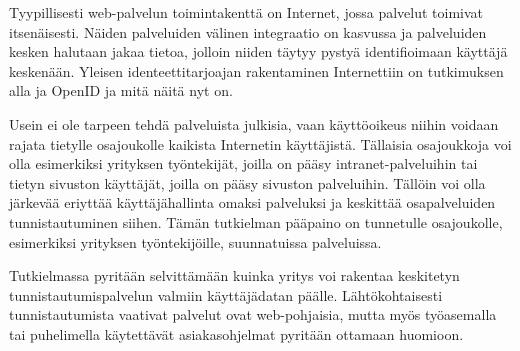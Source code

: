 Tyypillisesti web-palvelun toimintakenttä on Internet, jossa palvelut toimivat itsenäisesti. Näiden palveluiden välinen integraatio on kasvussa ja palveluiden kesken halutaan jakaa tietoa, jolloin niiden täytyy pystyä identifioimaan käyttäjä keskenään. Yleisen identeettitarjoajan rakentaminen Internettiin on tutkimuksen alla ja OpenID ja mitä näitä nyt on. 

Usein ei ole tarpeen tehdä palveluista julkisia, vaan käyttöoikeus niihin voidaan rajata tietylle osajoukolle kaikista Internetin käyttäjistä. Tällaisia osajoukkoja voi olla esimerkiksi yrityksen työntekijät, joilla on pääsy intranet-palveluihin tai tietyn sivuston käyttäjät, joilla on pääsy sivuston palveluihin. Tällöin voi olla järkevää eriyttää käyttäjähallinta omaksi palveluksi ja keskittää osapalveluiden tunnistautuminen siihen. Tämän tutkielman pääpaino on tunnetulle osajoukolle, esimerkiksi yrityksen työntekijöille, suunnatuissa palveluissa.

Tutkielmassa pyritään selvittämään kuinka yritys voi rakentaa keskitetyn tunnistautumispalvelun valmiin käyttäjädatan päälle. Lähtökohtaisesti tunnistautumista vaativat palvelut ovat web-pohjaisia, mutta myös työasemalla tai puhelimella käytettävät asiakasohjelmat pyritään ottamaan huomioon.
